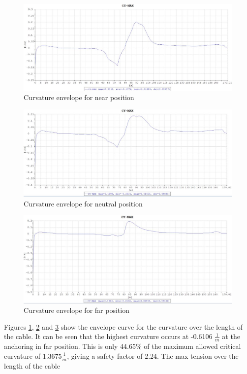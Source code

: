 \begin{figure}[H]
\centering
\includegraphics[scale=0.8]{figures/envcurvenear}
\caption[$\; \:$Curvature envelope for near position]{Curvature envelope for near position}
 \label{fig:envcurvenear}
\end{figure}

\begin{figure}[H]
\centering
\includegraphics[scale=0.8]{figures/envcurveneu}
\caption[$\; \:$Curvature envelope for neutral position]{Curvature envelope for neutral position}
 \label{fig:envcurveneu}
\end{figure}

\begin{figure}[H]
\centering
\includegraphics[scale=0.8]{figures/envcurvefar}
\caption[$\; \:$Curvature envelope for far position]{Curvature envelope for far position}
 \label{fig:envcurvefar}
\end{figure}
\noindent Figures \ref{fig:envcurvenear}, \ref{fig:envcurveneu} and \ref{fig:envcurvefar} show the envelope curve for the curvature over the length of the cable. It can be seen that the highest curvature occurs at -0.6106 $\frac{1}{m}$ at the anchoring in far position. This is only 44.65\% of the maximum allowed critical curvature of 1.3675$\frac{1}{m}$, giving a safety factor of 2.24. \newline
  \newline
 \noindent The max tension over the length of the cable

